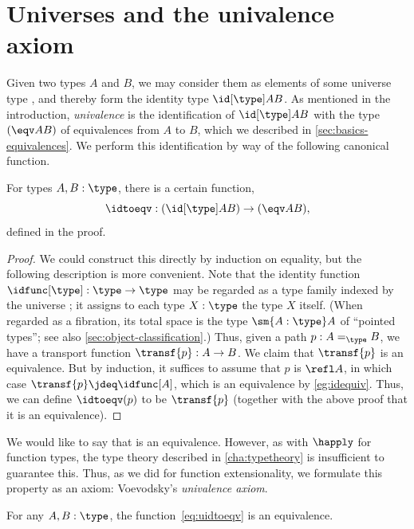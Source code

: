 \section{Universes and the univalence axiom}
\label{sec:compute-universe}

%
%
Given two types $A$ and $B$, we may consider them as elements of some universe type \type, and thereby form the identity type $\id[\type]AB$.
As mentioned in the introduction, \emph{univalence} is the identification of $\id[\type]AB$ with the type $(\eqv AB)$ of equivalences from $A$ to $B$, which we described in \cref{sec:basics-equivalences}.
We perform this identification by way of the following canonical function.

\begin{lem}\label{thm:idtoeqv}
  For types $A,B:\type$, there is a certain function,
  \begin{equation}\label{eq:uidtoeqv}
    \idtoeqv : (\id[\type]AB) \to (\eqv A B),
  \end{equation}
  defined in the proof.
\end{lem}
\begin{proof}
  We could construct this directly by induction on equality, but the following description is more convenient.
  Note that the identity function $\idfunc[\type]:\type\to\type$ may be regarded as a type family indexed by the universe \type; it assigns to each type $X:\type$ the type $X$ itself.
  (When regarded as a fibration, its total space is the type $\sm{A:\type}A$ of ``pointed types''; see also \cref{sec:object-classification}.)
  Thus, given a path $p:A =_\type B$, we have a transport function $\transf{p}:A \to B$.
  We claim that $\transf{p}$ is an equivalence.
  But by induction, it suffices to assume that $p$ is $\refl A$, in which case $\transf{p} \jdeq \idfunc[A]$, which is an equivalence by \cref{eg:idequiv}.
  Thus, we can define $\idtoeqv(p)$ to be $\transf{p}$ (together with the above proof that it is an equivalence).
\end{proof}

We would like to say that \idtoeqv is an equivalence.
However, as with $\happly$ for function types, the type theory described in \cref{cha:typetheory} is insufficient to guarantee this.
Thus, as we did for function extensionality, we formulate this property as an axiom: Voevodsky's \emph{univalence axiom}.

\begin{axiom}[Univalence]\label{axiom:univalence}
  For any $A,B:\type$, the function~\eqref{eq:uidtoeqv} is an equivalence.
\end{axiom}

